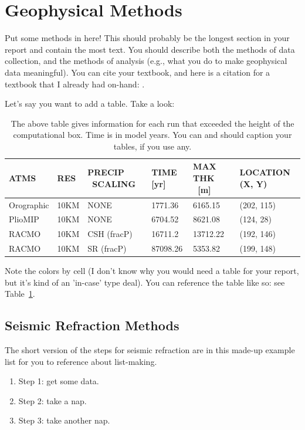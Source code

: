 \documentclass[12pt]{article}
\begin{document}
\section{Geophysical Methods}
Put some methods in here! This should probably be the longest section in your report and contain the most text. You should describe both the methods of data collection, and the methods of analysis (e.g., what you do to make geophysical data meaningful). You can cite your textbook, and here is a citation for a textbook that I already had on-hand: \textcite{ContMech}.

Let's say you want to add a table. Take a look:
\begin{table}[!htbp]
\centering
\begin{tabular}{ |p{2cm}|p{1.3cm}|p{2.4cm}|p{2cm}|p{2cm}|p{2.1cm}| }
\hline
ATMS & RES & PRECIP \ SCALING & TIME [yr] & MAX THK \ [m] &LOCATION (X, Y)\\
\hline
Orographic & 10KM & NONE & 1771.36 & 6165.15 & (202, 115)\\
PlioMIP & 10KM & NONE & 6704.52 & 8621.08 & (124, 28) \\
RACMO & 10KM & \cellcolor{JungleGreen!25} CSH (fracP) & 16711.2 & 13712.22 & (192, 146)\\
RACMO & 10KM & SR (fracP) & 87098.26 & 5353.82 & (199, 148)\\
\hline
\end{tabular}
\caption{The above table gives information for each run that exceeded the height of the computational box. Time is in model years. You can and should caption your tables, if you use any.}
\label{table:max_thickness}
\end{table}

Note the colors by cell (I don't know why you would need a table for your report, but it's kind of an 'in-case' type deal). You can reference the table like so: see Table~\ref{table:max_thickness}.

\subsection{Seismic Refraction Methods}
\label{sec:refraction} %
The short version of the steps for seismic refraction are in this made-up example list for you to reference about list-making.
\begin{enumerate}
    \item Step 1: get some data.
    \item Step 2: take a nap.
    \item Step 3: take another nap.
\end{enumerate}
\end{document}
